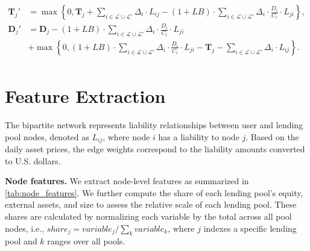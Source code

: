 \documentclass[a4paper,UKenglish,cleveref, autoref, thm-restate]{informs3}
\begin{document}
\begin{align*}
    \mathbf{T}_j' &= \max\left\{0,\mathbf{T}_j + \sum_{i\in \mathcal{L} \cup \mathcal{L}'} \Delta_i \cdot L_{ij} - (1 + LB)\cdot\sum_{i\in \mathcal{L} \cup \mathcal{L}'} \Delta_i\cdot \frac{D_i}{C_i}\cdot L_{ji}\right\},\\
    \mathbf{D}_j' &= \mathbf{D}_j - (1 + LB)\cdot \sum_{i\in \mathcal{L}\cup\mathcal{L}'} \Delta_i \cdot \frac{D_i}{C_i}\cdot L_{ji}\\
    &+\max\left\{0,(1 + LB)\cdot\sum_{i\in \mathcal{L} \cup \mathcal{L}'} \Delta_i\cdot \frac{D_i}{C_i}\cdot L_{ji}-\mathbf{T}_j - \sum_{i\in \mathcal{L} \cup \mathcal{L}'} \Delta_i \cdot L_{ij} \right\}.\\
\end{align*} 

\section{Feature Extraction}\label{app:feat_des_app}

The bipartite network represents liability relationships between user and lending pool nodes, denoted as $L_{ij}$, where node $i$ has a liability to node $j$. Based on the daily asset prices, the edge weights correspond to the liability amounts converted to U.S. dollars.

\textbf{Node features.} We extract node-level features as summarized in \autoref{tab:node_features}. We further compute the share of each lending pool's equity, external assets, and size to assess the relative scale of each lending pool. These shares are calculated by normalizing each variable by the total across all pool nodes, i.e., $share_j = variable_j / \sum_k variable_k$, where $j$ indexes a specific lending pool and $k$ ranges over all pools.
\end{document}
